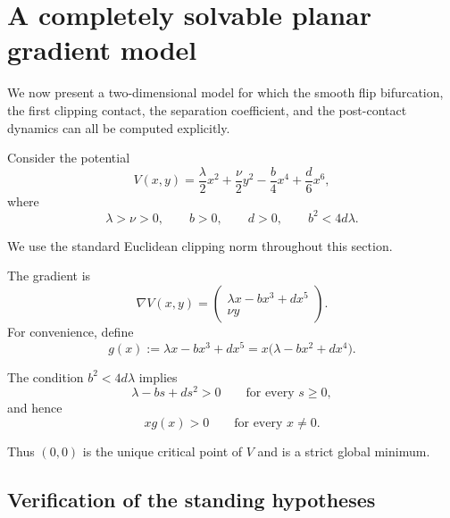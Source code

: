 \section{A completely solvable planar gradient model}
\label{sec:planar-model}

We now present a two-dimensional model for which the smooth flip
bifurcation, the first clipping contact, the separation coefficient,
and the post-contact dynamics can all be computed explicitly.

Consider the potential
\begin{equation}
V(x,y)
=
\frac{\lambda}{2}x^2
+
\frac{\nu}{2}y^2
-
\frac{b}{4}x^4
+
\frac{d}{6}x^6,
\label{eq:planar-potential}
\end{equation}
where
\begin{equation}
\lambda>\nu>0,
\qquad
b>0,
\qquad
d>0,
\qquad
b^2<4d\lambda.
\label{eq:planar-parameters}
\end{equation}

We use the standard Euclidean clipping norm throughout this section.

The gradient is
\begin{equation}
\nabla V(x,y)
=
\begin{pmatrix}
\lambda x-bx^3+dx^5
\\
\nu y
\end{pmatrix}.
\label{eq:planar-gradient}
\end{equation}
For convenience, define
\begin{equation}
g(x)
:=
\lambda x-bx^3+dx^5
=
x\bigl(\lambda-bx^2+dx^4\bigr).
\label{eq:g-definition}
\end{equation}

The condition $b^2<4d\lambda$ implies
\begin{equation}
\lambda-bs+ds^2>0
\qquad
\text{for every }s\geq0,
\label{eq:g-positive-factor}
\end{equation}
and hence
\begin{equation}
xg(x)>0
\qquad
\text{for every }x\neq0.
\label{eq:g-sign}
\end{equation}

Thus $(0,0)$ is the unique critical point of $V$ and is a strict
global minimum.

\subsection{Verification of the standing hypotheses}
\label{subsec:planar-hypotheses}

